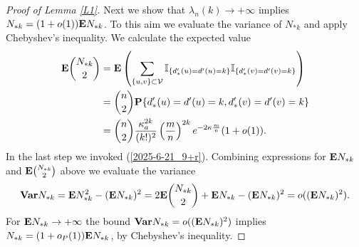 \documentclass[11pt, a4paper]{article}
\newcommand{\E}{{\bf{E}}}
\newcommand{\PP}{{\bf{P}}}
\newcommand{\Var}{{\bf{Var}}}
\begin{document}
\begin{proof}[Proof of Lemma \ref{L1}]
Next we  show that $\lambda_n(k)\to+\infty$ implies $N_{*k}=(1+o(1))\E N_{*k}$. To this aim we evaluate the variance of $N_{*k}$ and apply Chebyshev's inequality.
We calculate the expected value 
\begin{align*}
\E \binom{N_{*k}}{2}
&
=
\E
\left(
\sum_{\{u,v\}\subset {\cal V}}
{\mathbb I}_{\{d_*'(u)=d'(u)=k\}}{\mathbb I}_{\{d_*'(v)=d'(v)=k\}}\right)
\\
&
=
\binom{n}{2}\PP\{d_*'(u)=d'(u)=k, d_*'(v)=d'(v)=k\}
\\
&
=
\binom{n}{2}
\frac{\kappa_a^{2k}}{(k!)^2}\left(\frac{m}{n}\right)^{2k} e^{-2\kappa\frac{m}{n}}
 (1+o(1)). 
\end{align*}
In the last step we invoked (\ref{2025-6-21_9+r}). 
Combining expressions for $\E N_{*k}$ and 
$\E \binom{N_{*k}}{2}$ above we evaluate the variance
\begin{align*}
\Var N_{*k}
=
\E N_{*k}^2
-
(\E N_{*k})^2
=
2\E \binom{N_{*k}}{2}
+
\E N_{*k}
-
(\E N_{*k})^2
=
o((\E N_{*k})^2).
\end{align*}
For $\E N_{*k}\to+\infty$ the bound
$\Var N_{*k}=o((\E N_{*k})^2)$ implies $N_{*k}=(1+o_P(1))\E N_{*k}$, by Chebyshev's inequality.
\end{proof}
\end{document}
